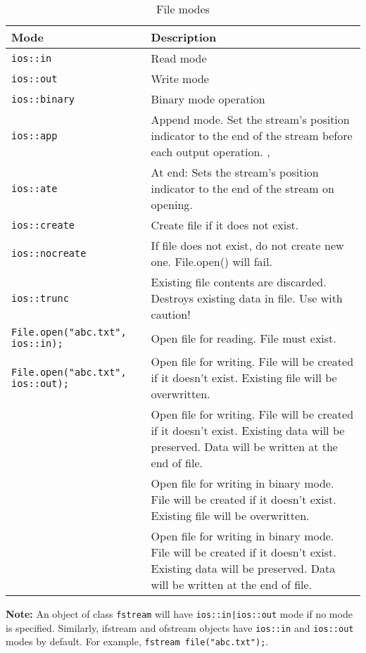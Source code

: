 \documentclass[12pt,a4paper]{article}
\begin{document}
\begin{table}[htb]
\begin{center}
\vspace{0.3cm}
	\begin{tabular}{lp{9cm}}
	\hline \hline
		\textbf{Mode} \rule{0pt}{2.6ex} & \textbf{Description}\\
		\hline
		\verb|ios::in| \rule{0pt}{2.6ex} & Read mode\\
		\verb|ios::out| \rule{0pt}{2.6ex} & Write mode\\
		\verb|ios::binary| \rule{0pt}{2.6ex} & Binary mode operation\\
		\verb|ios::app| \rule{0pt}{2.6ex} & Append mode. Set the stream's position indicator to the end of the stream before each output operation. \cite{Ref:SOF-ios-ate-app}, \cite{Ref:CPP-ios-ate-app}\\
		\verb|ios::ate| \rule{0pt}{2.6ex} & At end: Sets the stream's position indicator to the end of the stream on opening.\\
		\verb|ios::create| \rule{0pt}{2.6ex} & Create file if it does not exist.\\
		\verb|ios::nocreate| \rule{0pt}{2.6ex} & If file does not exist, do not create new one. File.open() will fail.\\
		\verb|ios::trunc| \rule{0pt}{2.6ex} & Existing file contents are discarded. Destroys existing data in file. Use with caution!\\
		\verb|File.open("abc.txt", ios::in);| \rule{0pt}{2.6ex} & Open file for reading. File must exist.\\
		\verb|File.open("abc.txt", ios::out);| \rule{0pt}{2.6ex} & Open file for writing. File will be created if it doesn't exist. Existing file will be overwritten.\\
		\verb\..., ios::out|ios::app);\ \rule{0pt}{2.6ex} & Open file for writing. File will be created if it doesn't exist. Existing data will be preserved. Data will be written at the end of file.\\
		\verb\..., ios::out|ios::binary);\ \rule{0pt}{2.6ex} & Open file for writing in binary mode. File will be created if it doesn't exist. Existing file will be overwritten.\\
		\verb\ios::out|ios::binary|ios::app\ \rule{0pt}{2.6ex} & Open file for writing in binary mode. File will be created if it doesn't exist. Existing data will be preserved. Data will be written at the end of file.\\
	\hline \hline
	\end{tabular}
\end{center}
\label{FileModes}
\caption{File modes}
\end{table}
\newline
\noindent\textbf{Note: }An object of class \verb|fstream| will have \verb$ios::in|ios::out$ mode if no mode is specified. Similarly, ifstream and ofstream objects have \verb|ios::in| and \verb|ios::out| modes by default. For example, \verb|fstream file("abc.txt");|.
\end{document}
